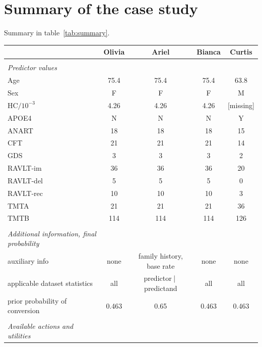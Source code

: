 \documentclass[utf8]{FrontiersinHarvard} %
\renewcommand*{\|}[1][]{\nonscript\:#1\vert\nonscript\:\mathopen{}}
\begin{document}
\newpage
\section{Summary of the case study}
\label{sec:summary}


Summary in table~\ref{tab:summary}.

\begin{table}[!t]
  \centering
  \begin{tabular}{lcccc}
    &{\small Olivia} &{\small Ariel} &{\small Bianca} &{\small Curtis}
    \\[\jot]
    \hline\\[-1.5\jot]
    \emph{\small Predictor values}&&&& \\[\jot]
    Age&75.4&75.4&75.4&\textcolor{redpurple}{63.8} \\
    Sex&F&F&F&\textcolor{redpurple}{M} \\
    HC${}/10^{-3}$&4.26&4.26&4.26&\textcolor{redpurple}{[missing]} \\
    APOE4&N&N&N&\textcolor{redpurple}{Y} \\
    ANART&18&18&18&\textcolor{redpurple}{15} \\
    CFT&21&21&21&\textcolor{redpurple}{14} \\
    GDS&3&3&3&\textcolor{redpurple}{2} \\
    RAVLT-im&36&36&36&\textcolor{redpurple}{20} \\
    RAVLT-del&5&5&5&\textcolor{redpurple}{0} \\
    RAVLT-rec&10&10&10&\textcolor{redpurple}{3} \\
    TMTA&21&21&21&\textcolor{redpurple}{36} \\
    TMTB&114&114&114&\textcolor{redpurple}{126}
    \\[2\jot] \hline\\
    \emph{\small Additional information, final probability}&&&& \\[\jot]
    {\small auxiliary info}&
    {\small none}&
    {\small\color{redpurple} family history, base rate}&
    {\small none}&
    {\small none}\\
    {\small applicable dataset statistics}&
    {\small all}&
    {\small\color{redpurple} predictor$\|$predictand}&
    {\small all}&
    {\small all}\\
    {\small prior probability of conversion}&
    0.463&\textcolor{redpurple}{0.65}&0.463&0.463
    \\[2\jot] \hline\\
    \emph{\small Available actions and utilities}&&&& \\[\jot]

\end{tabular}
\end{table}
\end{document}
